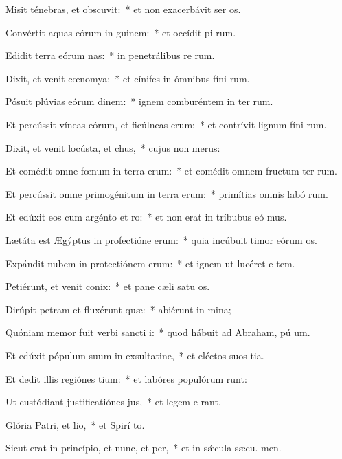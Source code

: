 \item Misit ténebras, et obscuvit:~* et non exacerbávit ser os.
\item Convértit aquas eórum in guinem:~* et occídit pi rum.
\item Edidit terra eórum nas:~* in penetrálibus re rum.
\item Dixit, et venit cœnomya:~* et cínifes in ómnibus fíni rum.
\item Pósuit plúvias eórum dinem:~* ignem comburéntem in ter rum.
\item Et percússit víneas eórum, et ficúlneas erum:~* et contrívit lignum fíni rum.
\item Dixit, et venit locústa, et chus,~* cujus non  merus:
\item Et comédit omne fœnum in terra erum:~* et comédit omnem fructum ter rum.
\item Et percússit omne primogénitum in terra erum:~* primítias omnis labó rum.
\item Et edúxit eos cum argénto et ro:~* et non erat in tríbubus eó mus.
\item Lætáta est Ægýptus in profectióne erum:~* quia incúbuit timor eórum  os.
\item Expándit nubem in protectiónem erum:~* et ignem ut lucéret e  tem.
\item Petiérunt, et venit conix:~* et pane cæli satu os.
\item Dirúpit petram et fluxérunt quæ:~* abiérunt in  mina;
\item Quóniam memor fuit verbi sancti i:~* quod hábuit ad Abraham, pú um.
\item Et edúxit pópulum suum in exsultatine,~* et eléctos suos  tia.
\item Et dedit illis regiónes tium:~* et labóres populórum runt:
\item Ut custódiant justificatiónes jus,~* et legem e rant.
\item Glória Patri, et lio,~* et Spirí to.
\item Sicut erat in princípio, et nunc, et per,~* et in sǽcula sæcu. men.
